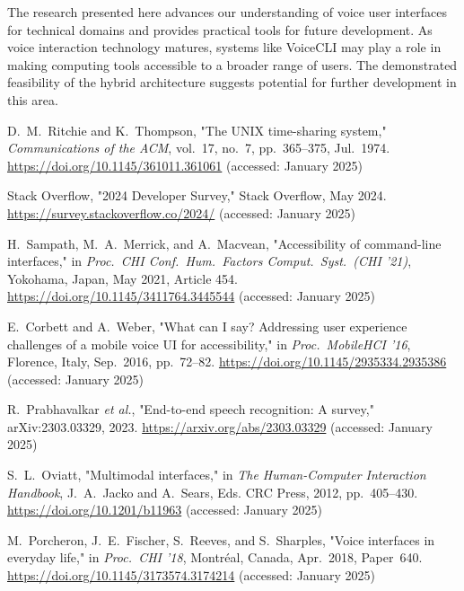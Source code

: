\documentclass[a4paper,12pt]{article}
\begin{document}
The research presented here advances our understanding of voice user interfaces for technical domains and provides practical tools for future development. As voice interaction technology matures, systems like VoiceCLI may play a role in making computing tools accessible to a broader range of users. The demonstrated feasibility of the hybrid architecture suggests potential for further development in this area.  


\newpage





\clearpage
\begin{thebibliography}{30}\itemsep-4pt\parsep-4pt\vspace{-2pt}
 D.~M.~Ritchie and K.~Thompson, "The UNIX time-sharing system," \textit{Communications of the ACM}, vol.~17, no.~7, pp.~365--375, Jul.~1974. \url{https://doi.org/10.1145/361011.361061} (accessed: January 2025)

 Stack Overflow, "2024 Developer Survey," Stack Overflow, May 2024. \url{https://survey.stackoverflow.co/2024/} (accessed: January 2025)

 H.~Sampath, M.~A.~Merrick, and A.~Macvean, "Accessibility of command-line interfaces," in \textit{Proc.~CHI Conf.~Hum.~Factors Comput.~Syst.~(CHI '21)}, Yokohama, Japan, May 2021, Article 454. \url{https://doi.org/10.1145/3411764.3445544} (accessed: January 2025)



 E.~Corbett and A.~Weber, "What can I say? Addressing user experience challenges of a mobile voice UI for accessibility," in \textit{Proc.~MobileHCI '16}, Florence, Italy, Sep.~2016, pp.~72--82. \url{https://doi.org/10.1145/2935334.2935386} (accessed: January 2025)

 R.~Prabhavalkar \textit{et al.}, "End-to-end speech recognition: A survey," arXiv:2303.03329, 2023. \url{https://arxiv.org/abs/2303.03329} (accessed: January 2025)

 S.~L.~Oviatt, "Multimodal interfaces," in \textit{The Human-Computer Interaction Handbook}, J.~A.~Jacko and A.~Sears, Eds. CRC Press, 2012, pp.~405--430. \url{https://doi.org/10.1201/b11963} (accessed: January 2025)

 M.~Porcheron, J.~E.~Fischer, S.~Reeves, and S.~Sharples, "Voice interfaces in everyday life," in \textit{Proc.~CHI '18}, Montréal, Canada, Apr.~2018, Paper~640. \url{https://doi.org/10.1145/3173574.3174214} (accessed: January 2025)


\end{thebibliography}
\end{document}
